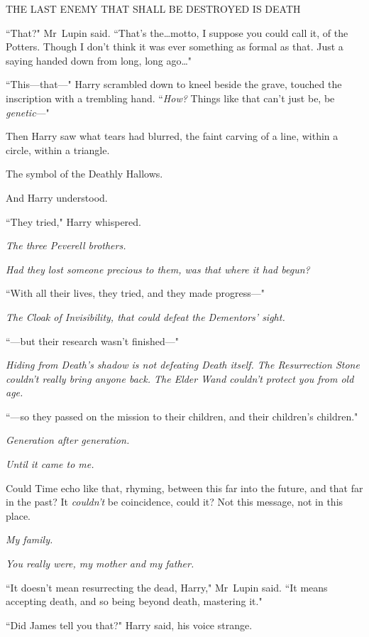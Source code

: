 \begin{center}
THE LAST ENEMY THAT SHALL BE DESTROYED IS DEATH
\end{center}

``That?" Mr~Lupin said. ``That's the…motto, I suppose you could call it, of the Potters. Though I don't think it was ever something as formal as that. Just a saying handed down from long, long ago…"

``This—that—" Harry scrambled down to kneel beside the grave, touched the inscription with a trembling hand. ``\emph{How?} Things like that can't just be, be \emph{genetic}—"

Then Harry saw what tears had blurred, the faint carving of a line, within a circle, within a triangle.

The symbol of the Deathly Hallows.

And Harry understood.

``They tried," Harry whispered.

\emph{The three Peverell brothers.}

\emph{Had they lost someone precious to them, was that where it had begun?}

``With all their lives, they tried, and they made progress—"

\emph{The Cloak of Invisibility, that could defeat the Dementors' sight.}

``—but their research wasn't finished—"

\emph{Hiding from Death's shadow is not defeating Death itself. The Resurrection Stone couldn't really bring anyone back. The Elder Wand couldn't protect you from old age.}

``—so they passed on the mission to their children, and their children's children."

\emph{Generation after generation.}

\emph{Until it came to me.}

Could Time echo like that, rhyming, between this far into the future, and that far in the past? It \emph{couldn't} be coincidence, could it? Not this message, not in this place.

\emph{My family.}

\emph{You really were, my mother and my father.}

``It doesn't mean resurrecting the dead, Harry," Mr~Lupin said. ``It means accepting death, and so being beyond death, mastering it."

``Did James tell you that?" Harry said, his voice strange.

